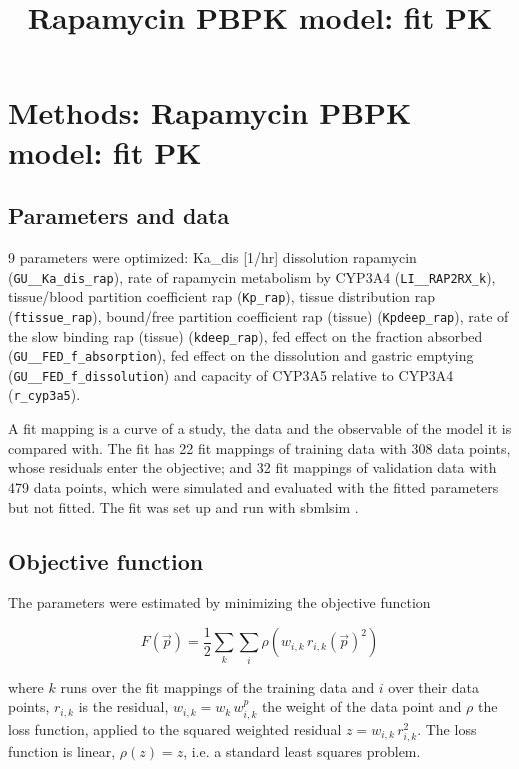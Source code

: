 \documentclass{article}
\title{Rapamycin PBPK model: fit PK}
\date{}
\begin{document}
\maketitle

\section{Methods: Rapamycin PBPK model: fit PK}

\subsection{Parameters and data}

9 parameters were optimized: Ka\_dis [1/hr] dissolution rapamycin (\texttt{GU\_\_Ka\_dis\_rap}), rate of rapamycin metabolism by CYP3A4 (\texttt{LI\_\_RAP2RX\_k}), tissue/blood partition coefficient rap (\texttt{Kp\_rap}), tissue distribution rap (\texttt{ftissue\_rap}), bound/free partition coefficient rap (tissue) (\texttt{Kpdeep\_rap}), rate of the slow binding rap (tissue) (\texttt{kdeep\_rap}), fed effect on the fraction absorbed (\texttt{GU\_\_FED\_f\_absorption}), fed effect on the dissolution and gastric emptying (\texttt{GU\_\_FED\_f\_dissolution}) and capacity of CYP3A5 relative to CYP3A4 (\texttt{r\_cyp3a5}).

A fit mapping is a curve of a study, the data and the observable of the model it is compared with. The fit has 22 fit mappings of training data with 308 data points, whose residuals enter the objective; and 32 fit mappings of validation data with 479 data points, which were simulated and evaluated with the fitted parameters but not fitted. The fit was set up and run with sbmlsim \cite{Koenig2026_sbmlsim}.

\subsection{Objective function}

The parameters were estimated by minimizing the objective function

\begin{equation}
F(\vec{p}) = \frac{1}{2} \sum_{k} \sum_{i} \rho\left(w_{i,k}\, r_{i,k}(\vec{p})^2\right)
\end{equation}

where $k$ runs over the fit mappings of the training data and $i$ over their data points, $r_{i,k}$ is the residual, $w_{i,k} = w_k\, w^{p}_{i,k}$ the weight of the data point and $\rho$ the loss function, applied to the squared weighted residual $z = w_{i,k}\, r_{i,k}^2$. The loss function is linear, $\rho(z) = z$, i.e. a standard least squares problem.
\end{document}
